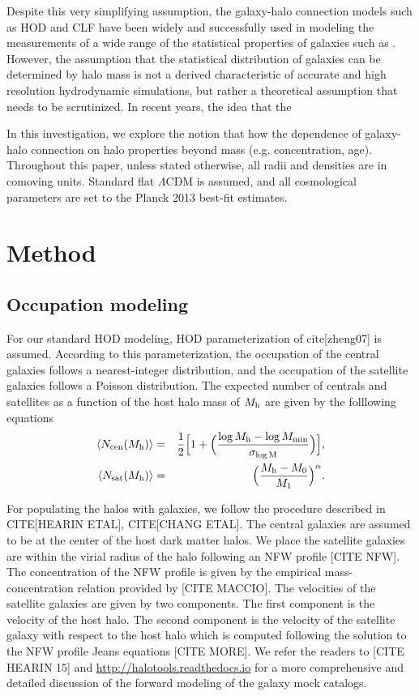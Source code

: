 \documentclass[12pt, preprint]{aastex}
\begin{document}
Despite this very simplifying assumption, the galaxy-halo connection models such as HOD and CLF
have been widely and successfully used in modeling the measurements of a wide range of the 
statistical properties of galaxies such as . However, the assumption that the statistical 
distribution of galaxies can be determined by halo mass is not a derived characteristic of 
accurate and high resolution hydrodynamic simulations, but rather a theoretical assumption 
that needs to be scrutinized. In recent years, the idea that the   

In this investigation, we explore the notion that how the dependence of 
galaxy-halo connection on halo properties beyond mass (e.g. concentration, age).
Throughout this paper, unless stated otherwise, 
all radii and densities are in comoving units. Standard flat $\Lambda$CDM is assumed, 
and all cosmological parameters are set to the Planck 2013 best-fit estimates.

\section{Method}
\subsection{Occupation modeling}
For our standard HOD modeling, HOD parameterization of cite[zheng07] is assumed. According to this parameterization, the occupation of the central galaxies follows a nearest-integer distribution, 
and the occupation of the satellite galaxies follows a Poisson distribution. The expected number of centrals and satellites as a function of the host halo mass of $M_{\rm h}$ are given by the folllowing equations 
\begin{eqnarray}
\langle N_{\rm cen}(M_{\rm h}) \rangle &=& \frac{1}{2}\Big[1+\Big(\frac{\log M_{\rm h} - \log M_{\rm min}}{\sigma_{\log \rm{M}}} \Big) \Big], \label{hod:central}\\ 
\langle N_{\rm sat}(M_{\rm h}) \rangle &=& \Big( \frac{M_{\rm h} - M_{\rm{0}}}{M_{\rm 1}} \Big)^{\alpha}. \label{hod:satellite}
\end{eqnarray}

For populating the halos with galaxies, we follow the procedure described in CITE[HEARIN ETAL], CITE[CHANG ETAL]. The central galaxies are assumed to be at the center of the host dark matter halos. We place the satellite galaxies are within the virial radius of the halo following an NFW profile [CITE NFW]. The concentration of the NFW profile is given by the empirical mass-concentration relation provided by [CITE MACCIO]. The velocities of the satellite galaxies are given by two components. The first component is the velocity of the host halo. The second component is the velocity of the satellite galaxy with respect to the host halo which is computed following the solution to the NFW profile Jeans equations [CITE MORE]. We refer the readers to [CITE HEARIN 15] and \url{http://halotools.readthedocs.io} for a more comprehensive and detailed discussion of the forward modeling of the galaxy mock catalogs. 
\end{document}
